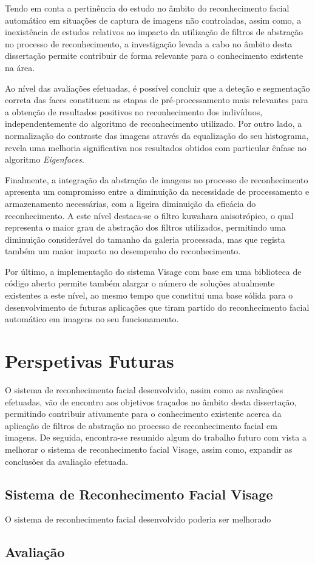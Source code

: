 Tendo em conta a pertinência do estudo no âmbito do reconhecimento facial automático em situações de captura de imagens não controladas, assim como, a inexistência de estudos relativos ao impacto da utilização de filtros de abstração no processo de reconhecimento, a investigação levada a cabo no âmbito desta dissertação permite contribuir de forma relevante para o conhecimento existente na área. 

Ao nível das avaliações efetuadas, é possível concluir que a deteção e segmentação correta das faces constituem as etapas de pré-processamento mais relevantes para a obtenção de resultados positivos no reconhecimento dos indivíduos, independentemente do algoritmo de reconhecimento utilizado. Por outro lado, a normalização do contraste das imagens através da equalização do seu histograma, revela uma melhoria significativa nos resultados obtidos com particular ênfase no algoritmo \textit{Eigenfaces}. 

Finalmente, a integração da abstração de imagens no processo de reconhecimento apresenta um compromisso entre a diminuição da necessidade de processamento e armazenamento necessárias, com a ligeira diminuição da eficácia do reconhecimento. A este nível destaca-se o filtro kuwahara anisotrópico, o qual representa o maior grau de abstração dos filtros utilizados, permitindo uma diminuição considerável do tamanho da galeria processada, mas que regista também um maior impacto no desempenho do reconhecimento.

Por último, a implementação do sistema Visage com base em uma biblioteca de código aberto permite também alargar o número de soluções atualmente existentes a este nível, ao mesmo tempo que constitui uma base sólida para o desenvolvimento de futuras aplicações que tiram partido do reconhecimento facial automático em imagens no seu funcionamento.

\section{Perspetivas Futuras}
O sistema de reconhecimento facial desenvolvido, assim como as avaliações efetuadas, vão de encontro aos objetivos traçados no âmbito desta dissertação, permitindo contribuir ativamente para o conhecimento existente acerca da aplicação de filtros de abstração no processo de reconhecimento facial em imagens. De seguida, encontra-se resumido algum do trabalho futuro com vista a melhorar o sistema de reconhecimento facial Visage, assim como, expandir as conclusões da avaliação efetuada.

\subsection{Sistema de Reconhecimento Facial Visage}
O sistema de reconhecimento facial desenvolvido poderia ser melhorado
\subsection{Avaliação}
